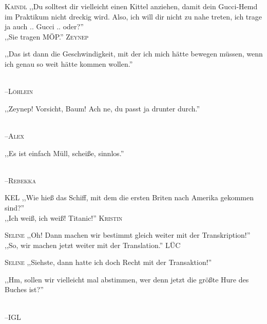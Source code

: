 \vspace{3mm}
\hangindent=0.7cm
\raggedright \textsc{\footnotesize Kaindl} ,,Du solltest dir vielleicht einen Kittel anziehen, damit dein Gucci-Hemd im Praktikum nicht dreckig wird. Also, ich will dir nicht zu nahe treten, ich trage ja auch .. Gucci .. oder?''\\
\raggedleft ,,Sie tragen MÖP.'' \textsc{\footnotesize Zeynep}\\

\vspace{3mm}
{\raggedright ,,Das ist dann die Geschwindigkeit, mit der ich mich hätte bewegen müssen, wenn ich genau so weit hätte kommen wollen.''}\\
\raggedleft \textsc{\footnotesize --\/Löhlein}\\

\vspace{3mm}
{\raggedright ,,Zeynep! Vorsicht, Baum! Ach ne, du passt ja drunter durch.''}\\
\raggedleft \textsc{\footnotesize --\/Alex}\\

\vspace{3mm}
{\raggedright ,,Es ist einfach Müll, scheiße, sinnlos.''}\\
\raggedleft \textsc{\footnotesize --\/Rebekka}\\

\vspace{3mm}
\hangindent=0.7cm
\raggedright \textsc{\footnotesize KEL} ,,Wie hieß das Schiff, mit dem die ersten Briten nach Amerika gekommen sind?''\\
\raggedleft ,,Ich weiß, ich weiß! Titanic!'' \textsc{\footnotesize Kristin}\\

\vspace{3mm}
\hangindent=0.7cm
\raggedright \textsc{\footnotesize Seline} ,,Oh! Dann machen wir bestimmt gleich weiter mit der Transkription!''\\
\raggedleft ,,So, wir machen jetzt weiter mit der Translation.'' \textsc{\footnotesize LÜC}\\
\hangindent=0.7cm
\raggedright \textsc{\footnotesize Seline} ,,Siehste, dann hatte ich doch Recht mit der Transaktion!''\\

\vspace{3mm}
{\raggedright ,,Hm, sollen wir vielleicht mal abstimmen, wer denn jetzt die größte Hure des Buches ist?''}\\
\raggedleft \textsc{\footnotesize --\/IGL}\\

